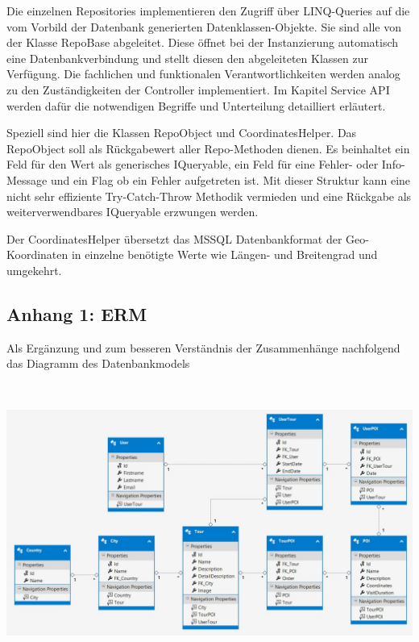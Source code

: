 \documentclass[a4paper,10pt,xetex]{article}
\begin{document}
  Die einzelnen Repositories implementieren den Zugriff \"uber LINQ-Queries auf die vom Vorbild der Datenbank generierten
  Datenklassen\--Objekte. Sie sind alle von der Klasse RepoBase abgeleitet. Diese \"offnet bei der Instanzierung
  automatisch eine Datenbankverbindung und stellt diesen den abgeleiteten Klassen zur Verf\"ugung. Die fachlichen und
  funktionalen Verantwortlichkeiten werden analog zu den Zust\"andigkeiten der Controller implementiert. Im Kapitel
  Service API werden daf\"ur die notwendigen Begriffe und Unterteilung detailliert erl\"autert.

  Speziell sind hier die Klassen RepoObject und CoordinatesHelper. Das RepoObject soll als R\"uckgabewert aller
  Repo-Methoden dienen. Es beinhaltet ein Feld f\"ur den Wert als generisches IQueryable, ein Feld f\"ur eine Fehler-
  oder Info-Message und ein Flag ob ein Fehler aufgetreten ist. Mit dieser Struktur kann eine nicht sehr effiziente
  Try-Catch-Throw Methodik vermieden und eine R\"uckgabe als weiterverwendbares IQueryable erzwungen werden.


  Der CoordinatesHelper \"ubersetzt das MSSQL Datenbankformat der Geo-Koordinaten in einzelne ben\"otigte Werte wie
  L\"angen- und Breitengrad und umgekehrt.

\subsection[Anhang 1: ERM]{Anhang 1: ERM}

  Als Erg\"anzung und zum besseren Verst\"andnis der Zusammenh\"ange nachfolgend das Diagramm des Datenbankmodels

\includegraphics[width=6.5in,height=3.6091in]{erm.jpg}
\end{document}
